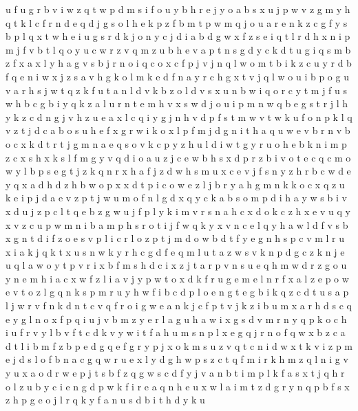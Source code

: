 \documentclass{article}
\begin{document}
u f
u
g r b v
i w z q t
w p d m s i f o u y b h
r e j y
o a b s x u j p w v z g m y h q t k l c f r n d e
q d j g s o l h e k p z f b m
t p w m q j o u a r e n k z c g f y s
b p l q x t w h e i u g s r d k j o n y c
j d i a
b d g w x f z s e i q t l r
d h x n i p m j f v b t l q o y u c w r z
v
q m
z u b h e v a p t n s g d
y c k d t u g i q s m b z f x a
x l y h a g v s b j r n o i q c
o x c f p j
v j n q l w o
m t b i k z
c u y r d b f q e n i w x j z s a v h g k o l
m k e d f n a y r c h g x t v j q l w o u i b
p o g u v a r h s j w t q z k f
u t a n l d v k b z
o l d v s x u n b w i q
o r c y t m j f u s w h b
c g b i y q k z a l u r n t e m h v x s w d j
o u i p m n w q b e g s t r j l h y k z c d
n g j v h
z u e a x l c q i y g j n h v d p f s t m w
v t w k u f o
n p k l q v z t j d c a b o s u h e f x g r w i
k o x l p f m j d g n i t h a q u w e v b r
n v b o c x k d t r
t j g m n a e q s o v k c p y z h u l d i w
t g y r u o h e b k n i m p z c x s
h x k s l f m g y v q d i o a u z j c e w b
h s x d p r z b i v o t e c q
c m o w y l b p s e g t j z k q n r x h a f
j z d w h s m u x
c e
v j f s n y z h r b c w d
e y q x a d h
d z h b w o p x
x d t p i c o w e z l j b r y a h g m n k
k
o c x q z
u k e i p j d a
e v z p t j w u m o f n l g d x q y c k a b s
o m p d i
h a y w s b i v x d u j z p c l t
q e b z g w u j f p l y k i m v r s n a h c x d o
k c z h x e v u q y
x v z c u p w m n i b
a m p h s r o t i j f w q k y x v n c e l
q y h a w l d f v s b x g
n t d i f z o e s v p l
i c r l o z p t j m d
o w b d t f y e g n h s p c v m l r u x i a k j q
k
t x u s n w k y r
h c g d f e q m l u t a z w s v k n p
d g c z k n j e u q l a w o y t p v r i x b f m s h
d c i x z j t a r p v n s u e q h m w
d r z g o u y n e m h i a c x w f
z l i a v j y p w t o x d k f r u g e m
e l
n r f x a l z e p o w
e v t o z l g q n k s p m r u y h w f i b c d
p l o e n g t
e g b i k q z c d t u s a p l j w r v f n
k d n t c v q f r o i g w
e a n k j c
f p t v j k z i b u m x a r h d s c q e y g l n
o x f p q i u j v b m z y e r l a g
u h a w i x g s d v m r n y q p k o c
h i
u f r v y l
b v f t
c d k v y w i t f a h u m s n p l x e g q j r
n o f q w x b z c a d t l
i b
m f z b p e d g q
e f g r y p j x o k m s u z v q t c n i d w
x t k v i z p m e j d s l o f b n a c g q w r
u e x l y d g h w p s z c t q f m i r
k h m z q l n i g v y u x a o d r w e p j t s b f
z q g w s c d f y j v a n b t i m p l k
f a s x t j q h r o l z u b y c i e n g d p w k
f i r e a q n
h e u x w l a i m t z d g r y n q p b f s
x z h p g e o j l r q k y f a n u s d b i t
h d y k u
\end{document}
